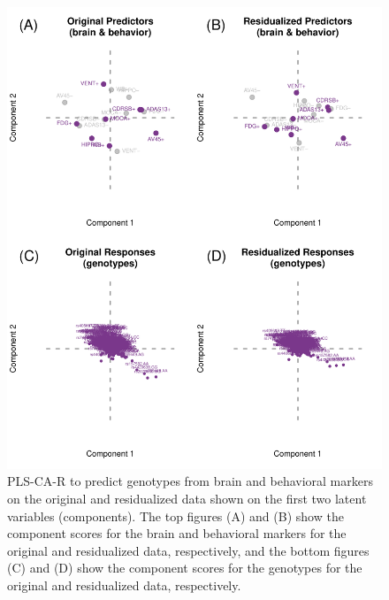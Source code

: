 \documentclass[12pt]{article}
\begin{document}
\begin{figure}[!hbtp]

{\centering \includegraphics[width=.8\textwidth,height=.8\textheight]{PLSCAR_to_a_GPLS_files/figure-latex/unnamed-chunk-9-1} 

}

\caption{\label{fig:original_residualized_ex2} PLS-CA-R to predict genotypes from brain and behavioral markers on the original and residualized data shown on the first two latent variables (components). The top figures (A) and (B) show the component scores for the brain and behavioral markers for the original and residualized data, respectively, and the bottom figures (C) and (D) show the component scores for the genotypes for the original and residualized data, respectively.}\label{fig:unnamed-chunk-9}
\end{figure}
\end{document}

